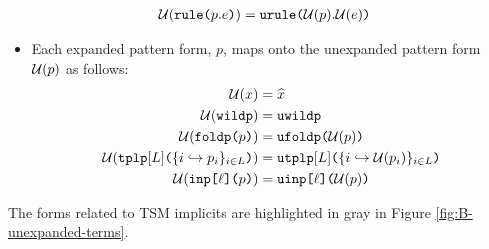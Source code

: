 \begin{itemize}
\begin{align*}
\mathcal{U}(\texttt{rule}\texttt{(}p.e\texttt{)}) & = \texttt{urule}\texttt{(}\mathcal{U}(p).\mathcal{U}(e)\texttt{)}
\end{align*}
\item Each expanded pattern form, $p$, maps onto the unexpanded pattern form $\mathcal{U}(p)$ as follows:
\begin{align*}
\mathcal{U}(x) & = \widehat{x}\\
\mathcal{U}(\texttt{wildp}) &= \texttt{uwildp}\\
\mathcal{U}(\texttt{foldp}\texttt{(}p\texttt{)}) &= \texttt{ufoldp}\texttt{(}\mathcal{U}(p)\texttt{)}\\
\mathcal{U}(\texttt{tplp}[L]\texttt{(}\{i \hookrightarrow p_{i}\}_{i \in L}\texttt{)}) & = \texttt{utplp}[L]\texttt{(}\{i \hookrightarrow \mathcal{U}(p_{i})\}_{i \in L}\texttt{)}\\
\mathcal{U}(\texttt{inp}\texttt{[}\ell\texttt{](}p\texttt{)}) & = \texttt{uinp}\texttt{[}\ell\texttt{](}\mathcal{U}(p)\texttt{)}
\end{align*}
\end{itemize}

The forms related to TSM implicits are highlighted in gray in Figure \ref{fig:B-unexpanded-terms}.

